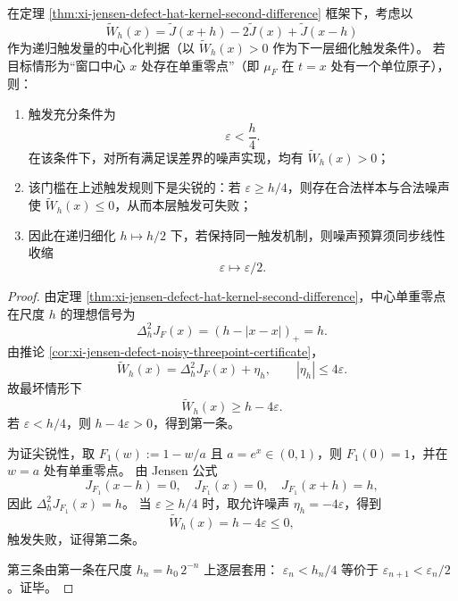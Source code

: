 \begin{theorem}\label{thm:xi-jensen-recursive-resolution-noise-coupling}
在定理 \ref{thm:xi-jensen-defect-hat-kernel-second-difference} 框架下，考虑以
\[
\widetilde W_h(x)=\widetilde J(x+h)-2\widetilde J(x)+\widetilde J(x-h)
\]
作为递归触发量的中心化判据（以 \(\widetilde W_h(x)>0\) 作为下一层细化触发条件）。
若目标情形为“窗口中心 \(x\) 处存在单重零点”（即 \(\mu_F\) 在 \(t=x\) 处有一个单位原子），则：
\begin{enumerate}
  \item 触发充分条件为
  \[
  \varepsilon<\frac{h}{4}.
  \]
  在该条件下，对所有满足误差界的噪声实现，均有 \(\widetilde W_h(x)>0\)；
  \item 该门槛在上述触发规则下是尖锐的：若 \(\varepsilon\ge h/4\)，则存在合法样本与合法噪声使 \(\widetilde W_h(x)\le 0\)，从而本层触发可失败；
  \item 因此在递归细化 \(h\mapsto h/2\) 下，若保持同一触发机制，则噪声预算须同步线性收缩
  \[
  \varepsilon\mapsto \varepsilon/2.
  \]
\end{enumerate}
\end{theorem}
\begin{proof}
由定理 \ref{thm:xi-jensen-defect-hat-kernel-second-difference}，中心单重零点在尺度 \(h\) 的理想信号为
\[
\Delta_h^2J_F(x)=(h-|x-x|)_+=h.
\]
由推论 \ref{cor:xi-jensen-defect-noisy-threepoint-certificate}，
\[
\widetilde W_h(x)=\Delta_h^2J_F(x)+\eta_h,\qquad |\eta_h|\le 4\varepsilon.
\]
故最坏情形下
\[
\widetilde W_h(x)\ge h-4\varepsilon.
\]
若 \(\varepsilon<h/4\)，则 \(h-4\varepsilon>0\)，得到第一条。

为证尖锐性，取 \(F_1(w):=1-w/a\) 且 \(a=e^x\in(0,1)\)，则 \(F_1(0)=1\)，并在 \(w=a\) 处有单重零点。
由 Jensen 公式
\[
J_{F_1}(x-h)=0,\quad J_{F_1}(x)=0,\quad J_{F_1}(x+h)=h,
\]
因此 \(\Delta_h^2J_{F_1}(x)=h\)。
当 \(\varepsilon\ge h/4\) 时，取允许噪声 \(\eta_h=-4\varepsilon\)，得到
\[
\widetilde W_h(x)=h-4\varepsilon\le 0,
\]
触发失败，证得第二条。

第三条由第一条在尺度 \(h_n=h_0\,2^{-n}\) 上逐层套用：
\(
\varepsilon_n<h_n/4
\)
等价于 \(\varepsilon_{n+1}<\varepsilon_n/2\)。证毕。
\end{proof}

